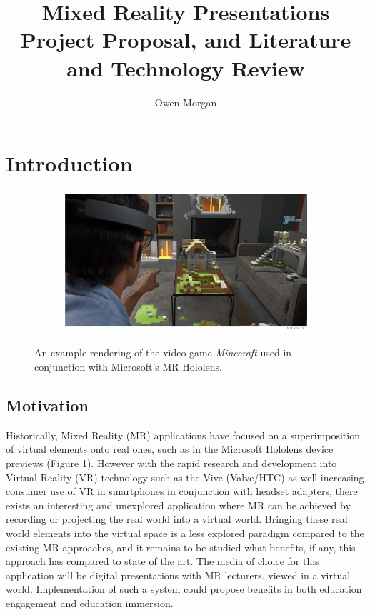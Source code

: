 \documentclass[11pt]{report}
\title{Mixed Reality Presentations\\Project Proposal, and Literature and Technology Review}
\author{Owen Morgan}
\date{}
\begin{document}
\maketitle
\chapter{Introduction}
\begin{figure}[h]
\centering
\begin{subfigure}[b]{0.7\textwidth}  
\includegraphics[width=\textwidth]{microsoft-minecraft.png}
\end{subfigure}
\caption{An example rendering of the video game \textit{Minecraft} used in conjunction with Microsoft's MR Hololens.\cite{Hollister2015}}
\end{figure}
\section{Motivation}
Historically, Mixed Reality (MR) applications have focused on a superimposition of virtual elements onto real ones, such as in the Microsoft Hololens device previews (Figure 1). However with the rapid research and development into Virtual Reality (VR) technology such as the Vive (Valve/HTC) as well increasing consumer use of VR in smartphones in conjunction with headset adapters, there exists an interesting and unexplored application where MR can be achieved by recording or projecting the real world into a virtual world. Bringing these real world elements into the virtual space is a less explored paradigm compared to the existing MR approaches, and it remains to be studied what benefits, if any, this approach has compared to state of the art. The media of choice for this application will be digital presentations with MR lecturers, viewed in a virtual world. Implementation of such a system could propose benefits in both education engagement and education immersion.
\end{document}
